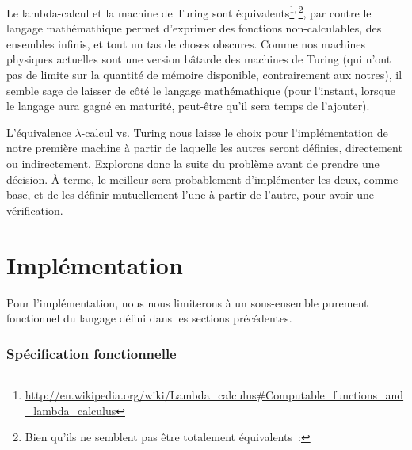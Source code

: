 \documentclass{article}
\begin{document}
Le lambda-calcul et la machine de Turing sont
équivalents\footnote{\url{http://en.wikipedia.org/wiki/Lambda_calculus\#Computable_functions_and_lambda_calculus}}$\vphantom{X}^{,}$\footnote{Bien qu'ils ne
  semblent pas être totalement équivalents\cite{lambda-turing-equivalence}~: },
par contre le langage mathémathique permet d'exprimer des fonctions non-calculables, des ensembles infinis, et tout un tas de choses
obscures. Comme nos machines physiques actuelles sont une version bâtarde des machines de Turing (qui n'ont pas de limite sur la quantité de
mémoire disponible, contrairement aux notres), il semble sage de laisser de côté le langage mathémathique (pour l'instant, lorsque le
langage aura gagné en maturité, peut-être qu'il sera temps de l'ajouter).

L'équivalence $\lambda$-calcul vs. Turing nous laisse le choix pour l'implémentation de notre première machine à partir de laquelle les autres seront définies, directement ou indirectement. Explorons donc la suite du problème avant de prendre une décision. À terme, le meilleur sera probablement d'implémenter les deux, comme base, et de les définir mutuellement l'une à partir de l'autre, pour avoir une vérification.

\part{Implémentation}
Pour l'implémentation, nous nous limiterons à un sous-ensemble purement fonctionnel du langage défini dans les sections précédentes.

\section{Spécification fonctionnelle}
\end{document}
